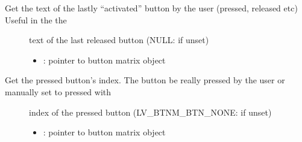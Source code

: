 \documentclass[letterpaper,10pt,english]{sphinxmanual}
\begin{document}

\begin{fulllineitems}
\label{\detokenize{object-types/btnm:_CPPv427lv_btnm_get_active_btn_textPK8lv_obj_t}}%
\pysigstartmultiline
{}\label{\detokenize{object-types/btnm:lv__btnm_8h_1a50df9e50ae0d8e4ae1a61a91f6730eb0}}%
\pysigstopmultiline
Get the text of the lastly “activated” button by the user (pressed, released etc) Useful in the the  \begin{description}
\item[{}] \leavevmode
text of the last released button (NULL: if unset) 

\item[{}] \leavevmode\begin{itemize}
\item {} 
: pointer to button matrix object 

\end{itemize}

\end{description}


\end{fulllineitems}


\begin{fulllineitems}
\label{\detokenize{object-types/btnm:_CPPv423lv_btnm_get_pressed_btnPK8lv_obj_t}}%
\pysigstartmultiline
{}\label{\detokenize{object-types/btnm:lv__btnm_8h_1a1152df53100d27dbee4395b42f15a2f0}}%
\pysigstopmultiline
Get the pressed button’s index. The button be really pressed by the user or manually set to pressed with  \begin{description}
\item[{}] \leavevmode
index of the pressed button (LV\_BTNM\_BTN\_NONE: if unset) 

\item[{}] \leavevmode\begin{itemize}
\item {} 
: pointer to button matrix object 

\end{itemize}

\end{description}


\end{fulllineitems}
\end{document}
